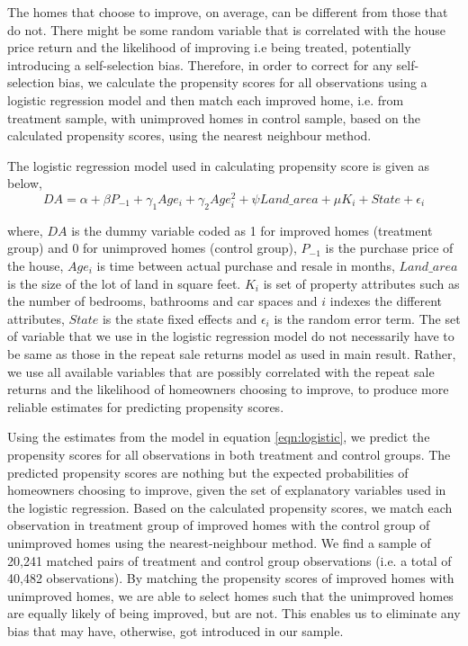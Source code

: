 \documentclass[AEJ,reqno, draftmode]{AEA} %
\begin{document}
The homes that choose to improve, on average, can be different from those that do not. There might be some random variable that is correlated with the house price return and the likelihood of improving i.e being treated, potentially introducing a self-selection bias. Therefore, in order to correct for any self-selection bias, we calculate the propensity scores for all observations using a logistic regression model and then match each improved home, i.e. from treatment sample, with unimproved homes in control sample, based on the calculated propensity scores, using the nearest neighbour method.

The logistic regression model used in calculating propensity score is given as below, \begin{equation} \label{eqn:logistic}
    DA = \alpha + \beta{P_{-1}}  + \gamma_1{Age_i} + \gamma_2{Age_i^2} + \psi{Land\_area} + \mu{K_i} + State + \epsilon_i
\end{equation}

where, $DA$ is the dummy variable coded as 1 for improved homes (treatment group) and 0 for unimproved homes (control group), $P_{-1}$ is the purchase price of the house, $Age_i$ is time between actual purchase and resale in months, $Land\_area$ is the size of the lot of land in square feet. $K_i$ is set of property attributes such as the number of bedrooms, bathrooms and car spaces and $i$ indexes the different attributes, $State$ is the state fixed effects and $\epsilon_i$ is the random error term. The set of variable that we use in the logistic regression model do not necessarily have to be same as those in the repeat sale returns model as used in main result. Rather, we use all available variables that are possibly correlated with the repeat sale returns and the likelihood of homeowners choosing to improve, to produce more reliable estimates for predicting propensity scores.

Using the estimates from the model in equation \ref{eqn:logistic}, we predict the propensity scores for all observations in both treatment and control groups. The predicted propensity scores are nothing but the expected probabilities of homeowners choosing to improve, given the set of explanatory variables used in the logistic regression. Based on the calculated propensity scores, we match each observation in treatment group of improved homes with the control group of unimproved homes using the nearest-neighbour method. We find a sample of 20,241 matched pairs of treatment and control group observations (i.e. a total of 40,482 observations). By matching the propensity scores of improved homes with unimproved homes, we are able to select homes such that the unimproved homes are equally likely of being improved, but are not. This enables us to eliminate any bias that may have, otherwise, got introduced in our sample.
\end{document}
